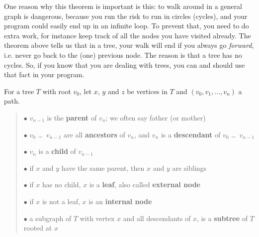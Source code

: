 One reason why this theorem is important is this: to walk around in a
general graph is dangerous, because you run the risk to run in circles
(cycles), and your program could easily end up in an infinite loop.
To prevent that, you need to do extra work, for instance keep track of
all the nodes you have visited already. The theorem above tells us
that in a tree, your walk will end if you always go {\em forward},
i.e. never go back to the (one) previous node. The reason is that a
tree has no cycles. So, if you know that you are dealing with trees,
you can and should use that fact in your program.


 \begin{definition}
\textup{For a tree $T$ with root $v_{0}$, let $x$, $y$ and $z$ be
vertices in $T$ and $(v_{0}, v_{1}, \ldots , v_{n})$ a path.
} {\rm
\begin{verse}
\hspace*{1ex}$\bullet$
$v_{n-1}$ is the \textbf{parent} of $v_{n}$; we often say father (or mother)

\hspace*{1ex}$\bullet$
$v_{0}$ \ldots\ $v_{n-1}$ are all
\textbf{ancestors} of $v_{n}$, and $v_{n}$ is a \textbf{descendant} of
$v_{0}$ \ldots\ $v_{n-1}$

\hspace*{1ex}$\bullet$
$v_{n}$ is a \textbf{child} of $v_{n-1}$

\hspace*{1ex}$\bullet$
if $x$ and $y$ have the same parent, then $x$ and $y$ are siblings

\hspace*{1ex}$\bullet$
if $x$ has no child, $x$ is a \textbf{leaf}, also called {\bf external node}

\hspace*{1ex}$\bullet$
if $x$ is not a leaf, $x$ is an \textbf{internal node}

\hspace*{1ex}$\bullet$
a subgraph of $T$ with vertex $x$ and all descendants of $x$, is a
{\bf subtree} of $T$ rooted at $x$\footnotemark
\end{verse}}
\end{definition}

